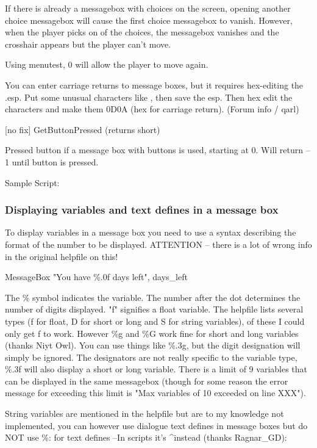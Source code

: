\documentclass[
]{article}
\begin{document}
If there is already a messagebox with choices on the screen, opening
another choice messagebox will cause the first choice messagebox to
vanish. However, when the player picks on of the choices, the messagebox
vanishes and the crosshair appears but the player can't move.

Using menutest, 0 will allow the player to move again.

You can enter carriage returns to message boxes, but it requires
hex-editing the .esp. Put some unusual characters like \textbar\textbar,
then save the esp. Then hex edit the \textbar\textbar{} characters and
make them 0D0A (hex for carriage return). (Forum info / qarl)

{[}no fix{]} GetButtonPressed (returns short)

Pressed button if a message box with buttons is used, starting at 0.
Will return --1 until button is pressed.

Sample Script:



\hypertarget{displaying-variables-and-text-defines-in-a-message-box}{%
\subsubsection{Displaying variables and text defines in a message
box}\label{displaying-variables-and-text-defines-in-a-message-box}}

To display variables in a message box you need to use a syntax
describing the format of the number to be displayed. ATTENTION -- there
is a lot of wrong info in the original helpfile on this!

MessageBox "You have \%.0f days left", days\_left

The \% symbol indicates the variable. The number after the dot
determines the number of digits displayed. "f" signifies a float
variable. The helpfile lists several types (f for float, D for short or
long and S for string variables), of these I could only get f to work.
However \%g and \%G work fine for short and long variables (thanks Niyt
Owl). You can use things like \%.3g, but the digit designation will
simply be ignored. The designators are not really specific to the
variable type, \%.3f will also display a short or long variable. There
is a limit of 9 variables that can be displayed in the same messagebox
(though for some reason the error message for exceeding this limit is
"Max variables of 10 exceeded on line XXX").

String variables are mentioned in the helpfile but are to my knowledge
not implemented, you can however use dialogue text defines in message
boxes but do NOT use \%: for text defines --In scripts it's \^{}instead
(thanks Ragnar\_GD):
\end{document}

